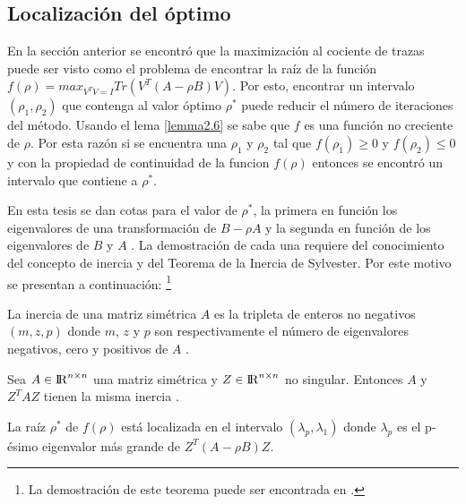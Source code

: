 \subsection{Localización del óptimo}

En la sección anterior se encontró que la maximización al cociente de trazas puede ser visto como el problema de encontrar la raíz de la función $f(\rho) = max_{V^T V= I} Tr(V^T(A-\rho B)V)$. Por esto, encontrar un intervalo $(\rho_1, \rho_2)$ que contenga al valor óptimo $\rho^*$ puede reducir el número de iteraciones del método. Usando el lema \ref{lemma2.6} se sabe que $f$ es una función no creciente de $\rho$. Por esta razón si se encuentra una $\rho_1$ y $\rho_2$ tal que $f(\rho_1) \geq 0$ y $f(\rho_2) \leq 0$ y con la propiedad de continuidad de la funcion $f(\rho)$ entonces se encontró un intervalo que contiene a $\rho^*$. 


En esta tesis se dan cotas para el valor de $\rho^*$, la primera en función los eigenvalores de una transformación de $B -\rho A$ y la segunda en función de los eigenvalores de $B$ y $A$ \cite{ngo2012trace}. La demostración de cada una requiere del conocimiento del concepto de inercia y del Teorema de la Inercia de Sylvester. Por este motivo se presentan a continuación: \footnote{La demostración de este teorema puede ser encontrada en \cite{golub2012matrix}.}

\begin{definition}
La inercia de una matriz simétrica $A$ es la tripleta de enteros no negativos $(m, z, p)$ donde $m$, $z$ y $p$ son respectivamente el número de eigenvalores negativos, cero y positivos de $A$ \cite{golub2012matrix}.
\end{definition}

\begin{theorem}\label{teorem.2}
Sea $A \in {\rm I\!R}^{n \times n}$ una matriz simétrica y $Z \in {\rm I\!R}^{n \times n}$ no singular. Entonces $A$ y $Z^T A Z$ tienen la misma inercia \cite{golub2012matrix}.
\end{theorem}

\begin{proposition}
La raíz $\rho^*$ de $f(\rho)$ está localizada en el intervalo $(\lambda_p, \lambda_1)$ donde $\lambda_p$ es el p-ésimo eigenvalor más grande de $Z^T(A-\rho B)Z$.
\end{proposition}

